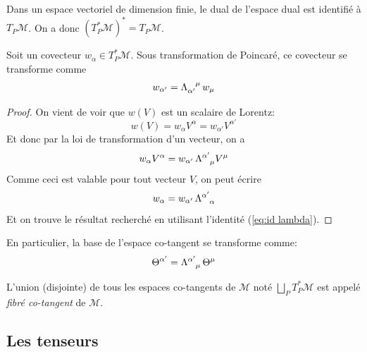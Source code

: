 {\begin{rmk}
    \label{rmk:tangent^2}
    Dans un espace vectoriel de dimension finie, le dual de l'espace dual est identifié à $T_P\mathcal{M}$. On a donc $(T^*_P\mathcal{M})^* = T_P\mathcal{M}$.
\end{rmk} 
\begin{theoremframe}
    \begin{propri}
        Soit un covecteur $w_\alpha\in T^*_P\mathcal{M}$. Sous transformation de Poincaré, ce covecteur se transforme comme
    \begin{align}
        w_{\alpha'} = \Lambda\indices{_{\alpha'}^{\mu}} \, w_\mu
    \end{align}
    \end{propri}
\end{theoremframe}
\begin{proof}
    On vient de voir que $w(V)$ est un scalaire de Lorentz:
    \begin{equation*}
        w(V) = w_{\alpha} V^{\alpha} = w_{\alpha'} V^{\alpha'} 
    \end{equation*}
    Et donc par la loi de transformation d'un vecteur, on a
    \begin{equation*}
        w_{\alpha} V^{\alpha} = w_{\alpha'}\, \Lambda\indices{^{\alpha'}_{\mu}} V^\mu
    \end{equation*}
    Comme ceci est valable pour tout vecteur $V$, on peut écrire
    \begin{equation*}
        w_{\alpha}  = w_{\alpha'} \,\Lambda\indices{^{\alpha'}_{\alpha}}
    \end{equation*}
    Et on trouve le résultat recherché en utilisant l'identité (\ref{eq:id lambda}).
\end{proof}

En particulier, la base de l'espace co-tangent se transforme comme:
\begin{equation}
    \Theta^{\alpha'} = \Lambda\indices{^{\alpha'}_{\mu}}\,  \Theta^{\mu}
\end{equation}
\begin{theoremframe}
    \begin{defi}
        L'union (disjointe) de tous les espaces co-tangents de $\mathcal{M}$ noté $\bigsqcup_P T^*_P\mathcal{M}$ est appelé \textit{fibré co-tangent} de $\mathcal{M}$.
    \end{defi}
\end{theoremframe}
}
\subsection{Les tenseurs}

